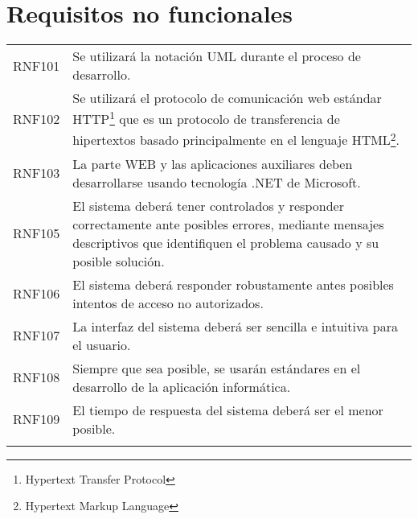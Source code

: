 \section{Requisitos no funcionales}
\begin{longtable}{lp{14cm}}
  RNF101\label{RNF101} & Se utilizará la notación UML durante el proceso de desarrollo. \\
  RNF102\label{RNF102} & Se utilizará el protocolo de comunicación web estándar HTTP\footnote{Hypertext Transfer Protocol} que es un protocolo de transferencia de hipertextos basado principalmente en el lenguaje HTML\footnote{Hypertext Markup Language }. \\
  RNF103\label{RNF103} & La parte WEB y las aplicaciones auxiliares deben desarrollarse usando tecnología .NET de Microsoft. \\
  RNF105\label{RNF104} & El sistema deberá tener controlados y responder correctamente ante posibles errores, mediante mensajes descriptivos que identifiquen el problema causado y su posible solución. \\
  RNF106\label{RNF105} & El sistema deberá responder robustamente antes posibles intentos de acceso no autorizados. \\
  RNF107\label{RNF106} & La interfaz del sistema deberá ser sencilla e intuitiva para el usuario. \\
  RNF108\label{RNF107} & Siempre que sea posible, se usarán estándares en el desarrollo de la aplicación informática. \\
  RNF109\label{RNF108} & El tiempo de respuesta del sistema deberá ser el menor posible. \\
  \label{cuadro:requisitos-no-funcionales}
\end{longtable}

\renewcommand{\arraystretch}{1} %